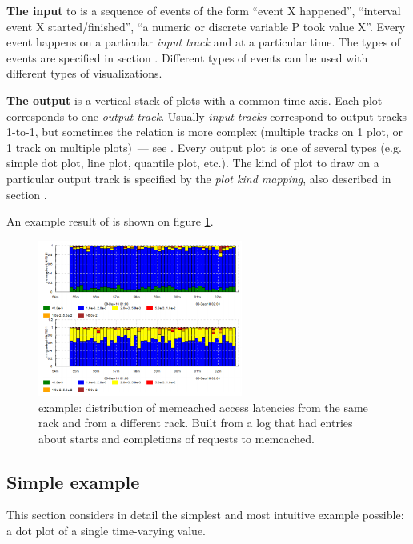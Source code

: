 \documentclass{article}
\begin{document}
\textbf{The input} to \timeplot{} is a sequence of events of the form ``event X happened'', ``interval event X started/finished'', ``a numeric or discrete variable P took value X''. Every event happens on a particular \emph{input track} and at a particular time. The types of events are specified in section . Different types of events can be used with different types of visualizations.

\textbf{The output} is a vertical stack of plots with a common time axis. Each plot corresponds to one \emph{output track}. Usually \emph{input tracks} correspond to output tracks 1-to-1, but sometimes the relation is more complex (multiple tracks on 1 plot, or 1 track on multiple plots)~--- see . Every output plot is one of several types (e.g. simple dot plot, line plot, quantile plot, etc.). The kind of plot to draw on a particular output track is specified by the \emph{plot kind mapping}, also described in section .

An example result of \timeplot{} is shown on figure \ref{fig:tplot-example}.

\begin{figure}[h]
\center
\includegraphics[width=0.6\textwidth]{pics/tplot/tplot-motivating-example.png}
\caption{\timeplot{} example: distribution of memcached access latencies from the same rack and from a different rack. Built from a log that had entries about starts and completions of requests to memcached.}
\label{fig:tplot-example}
\end{figure}

\pagebreak
\subsection{Simple example}
\label{sec:tplot-simple-example}
This section considers in detail the simplest and most intuitive example possible: a dot plot of a single time-varying value.
\end{document}
